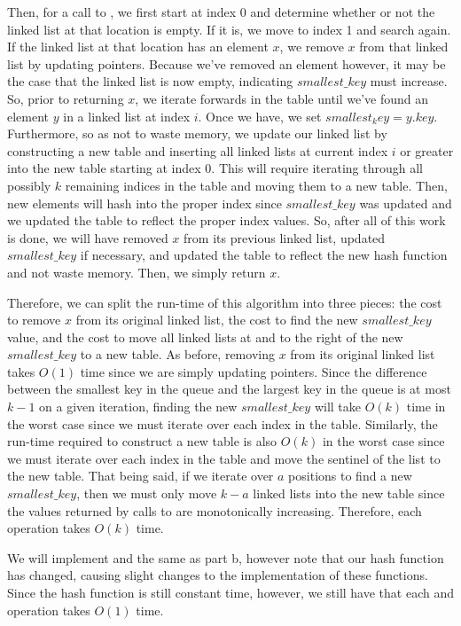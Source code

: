 \documentclass[11pt]{article}
\begin{document}
Then, for a call to , we first start at index 0 and determine whether or not the linked list at that location is empty. If it is, we move to index 1 and search again. If the linked list at that location has an element $x$, we remove $x$ from that linked list by updating pointers. Because we've removed an element however, it may be the case that the linked list is now empty, indicating $smallest\_key$ must increase. So, prior to returning $x$, we iterate forwards in the table until we've found an element $y$ in a linked list at index $i$. Once we have, we set $smallest_key = y.key$. Furthermore, so as not to waste memory, we update our linked list by constructing a new table and inserting all linked lists at current index $i$ or greater into the new table starting at index 0. This will require iterating through all possibly $k$ remaining indices in the table and moving them to a new table. Then, new elements will hash into the proper index since $smallest\_key$ was updated and we updated the table to reflect the proper index values. So, after all of this work is done, we will have removed $x$ from its previous linked list, updated $smallest\_key$ if necessary, and updated the table to reflect the new hash function and not waste memory. Then, we simply return $x$.

Therefore, we can split the run-time of this algorithm into three pieces: the cost to remove $x$ from its original linked list, the cost to find the new $smallest\_key$ value, and the cost to move all linked lists at and to the right of the new $smallest\_key$ to a new table. As before, removing $x$ from its original linked list takes $O(1)$ time since we are simply updating pointers. Since the difference between the smallest key in the queue and the largest key in the queue is at most $k-1$ on a given iteration, finding the new $smallest\_key$ will take $O(k)$ time in the worst case since we must iterate over each index in the table. Similarly, the run-time required to construct a new table is also $O(k)$ in the worst case since we must iterate over each index in the table and move the sentinel of the list to the new table. That being said, if we iterate over $a$ positions to find a new $smallest\_key$, then we must only move $k-a$ linked lists into the new table since the values returned by calls to  are monotonically increasing. Therefore, each  operation takes $O(k)$ time.

We will implement  and  the same as part b, however note that our hash function has changed, causing slight changes to the implementation of these functions. Since the hash function is still constant time, however, we still have that each  and  operation takes $O(1)$ time.
\end{document}
